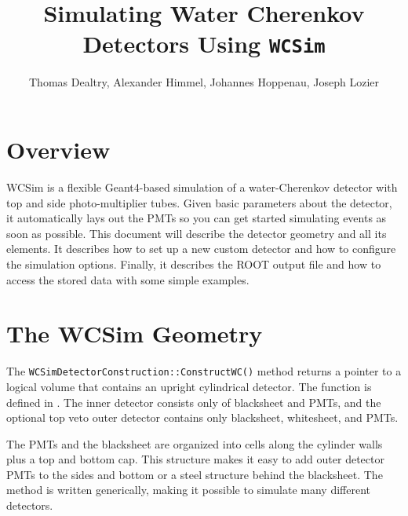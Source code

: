
\author{Thomas Dealtry, Alexander Himmel, Johannes Hoppenau, Joseph Lozier}
\title{Simulating Water Cherenkov Detectors Using \texttt{WCSim}}

\graphicspath{ {figures/} }


\maketitle
\tableofcontents


\section{Overview}

WCSim is a flexible Geant4-based simulation of a water-Cherenkov detector with top and side photo-multiplier tubes.  Given basic parameters about the detector, it automatically lays out the PMTs so you can get started simulating events as soon as possible.  This document will describe the detector geometry and all its elements.  It describes how to set up a new custom detector and how to configure the simulation options.  Finally, it describes the ROOT output file and how to access the stored data with some simple examples.


\section{The WCSim Geometry}
The \texttt{WCSimDetectorConstruction::ConstructWC()} method returns a pointer to a logical volume that contains an upright cylindrical detector. The function is defined in . The inner detector consists only of blacksheet and PMTs, and the optional top veto outer detector contains only blacksheet, whitesheet, and PMTs.

The PMTs and the blacksheet are organized into cells along the cylinder walls plus a top and bottom cap. This structure makes it easy to add outer detector PMTs to the sides and bottom or a steel structure behind the blacksheet. The method is written generically, making it possible to simulate many different detectors. 

